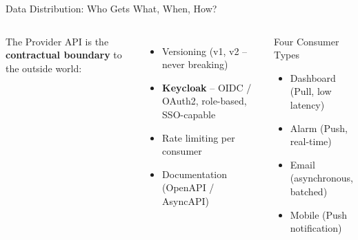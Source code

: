 \documentclass[aspectratio=169]{beamer}
\begin{document}
\begin{frame}{Data Distribution: Who Gets What, When, How?}
  \begin{columns}
      The Provider API is the \textbf{contractual boundary}
      to the outside world:
      \begin{itemize}
        \item Versioning (v1, v2 – never breaking)
        \item \textbf{Keycloak} – OIDC / OAuth2, role-based, SSO-capable
        \item Rate limiting per consumer
        \item Documentation (OpenAPI / AsyncAPI)
      \end{itemize}
      \begin{block}{Four Consumer Types}
        \begin{itemize}
          \item Dashboard (Pull, low latency)
          \item Alarm (Push, real-time)
          \item Email (asynchronous, batched)
          \item Mobile (Push notification)
        \end{itemize}
      \end{block}
  \end{columns}
\end{frame}
\end{document}
